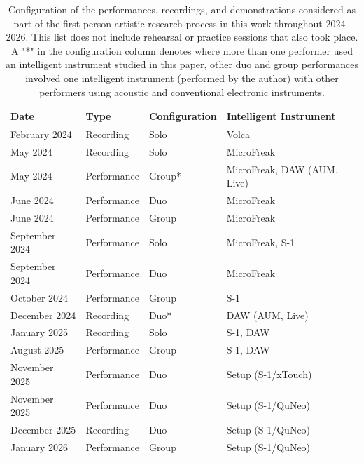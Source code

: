 \documentclass[sigconf]{nimeart}
\begin{document}
\begin{table}[]
\caption{Configuration of the performances, recordings, and demonstrations considered as part of the first-person artistic research process in this work throughout 2024--2026. This list does not include rehearsal or practice sessions that also took place.
A "*" in the configuration column denotes where more than one performer used an intelligent instrument studied in this paper, other duo and group performances involved one intelligent instrument (performed by the author) with other performers using acoustic and conventional electronic instruments.}
\label{tab:perf-corpus}
\begin{tabular}{@{}llll@{}}
Date           & Type           & Configuration & Intelligent Instrument      \\ \midrule
February 2024  & Recording      & Solo          & Volca                       \\
May 2024       & Recording      & Solo          & MicroFreak                  \\
May 2024       & Performance    & Group*        & MicroFreak, DAW (AUM, Live) \\
June 2024      & Performance    & Duo           & MicroFreak                  \\
June 2024      & Performance    & Group         & MicroFreak                  \\
September 2024 & Performance    & Solo          & MicroFreak, S-1             \\
September 2024 & Performance    & Duo           & MicroFreak                  \\
October 2024   & Performance    & Group         & S-1                         \\
December 2024  & Recording      & Duo*          & DAW (AUM, Live)             \\
January 2025   & Recording      & Solo          & S-1, DAW                    \\
August 2025    & Performance    & Group         & S-1, DAW                    \\
November 2025  & Performance    & Duo           & Setup (S-1/xTouch)          \\
November 2025  & Performance    & Duo           & Setup (S-1/QuNeo)           \\
December 2025  & Recording      & Duo           & Setup (S-1/QuNeo)           \\
January 2026   & Performance    & Group         & Setup (S-1/QuNeo)           \\
\end{tabular}
\end{table}
\end{document}
